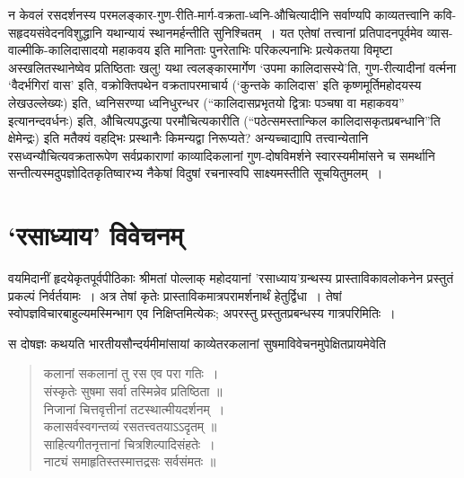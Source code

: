 {\dev न केवलं रसदर्शनस्य परमलङ्कार-गुण-रीति-मार्ग-वक्रता-ध्वनि-औचित्यादीनि सर्वाण्यपि काव्यतत्त्वानि कवि-सहृदयसंवेदनविशुद्धानि यथान्यायं स्थानमर्हन्तीति सुनिश्चितम्~। यत एतेषां तत्त्वानां प्रतिपादनपूर्वमेव व्यास-वाल्मीकि-कालिदासादयो महाकवय इति मानिताः पुनरेताभिः परिकल्पनाभिः प्रत्येकतया विमृष्टा अस्खलितस्थानेष्वेव प्रतिष्ठिताः खलु! यथा त्वलङ्कारमार्गेण `उपमा कालिदासस्ये'ति, गुण-रीत्यादीनां वर्त्मना `वैदर्भगिरां वास' इति, वक्रोक्तिपथेन वक्रतापरमाचार्य (`कुन्तके कालिदास' इति कृष्णमूर्तिमहोदयस्य लेख\break उल्लेख्यः) इति, ध्वनिसरण्या ध्वनिधुरन्धर (``कालिदासप्रभृतयो द्वित्राः पञ्चषा वा महाकवय'' इत्यानन्द\-वर्धनः) इति, औचित्यपद्धत्या परमौचित्यकारीति (``पठेत्समस्तान्किल कालिदास\-कृत\-प्रब\-न्धानि''ति  क्षेमेन्द्रः) इति मतैक्यं वहद्भिः प्रस्थानैः किमन्यद्वा निरूप्यते? अन्यच्चाद्यापि तत्त्वान्येतानि रसध्वन्यौचित्यवक्रतारूपेण सर्वप्रकाराणां काव्यादिकलानां गुण-दोषविमर्शने स्वारस्यमीमांसने च समर्थानि सन्तीत्यस्मदुपज्ञोदितकृतिष्वारभ्य नैकेषां विदुषां रचनास्वपि साक्ष्यमस्तीति सूचयितुमलम्~।} 

\section*{{\dev `रसाध्याय' विवेचनम्}}

{\dev वयमिदानीं हृदयेकृतपूर्वपीठिकाः श्रीमतां पोल्लाक् महोदयानां ’रसाध्याय’ग्रन्थस्य प्रास्तावि\-काव\-लोकनेन प्रस्तुतं प्रकल्पं निर्वर्तयामः~। अत्र तेषां कृतेः प्रास्ताविकमात्रपरामर्शनार्थं हेतु\-र्द्विधा~। तेषां स्वोपज्ञविचारबाहुल्यमस्मिन्भाग एव निक्षिप्तमित्येकः; अपरस्तु प्रस्तुतप्रबन्धस्य गात्र\-परिमितिः~।}

{\dev स दोषज्ञः कथयति भारतीयसौन्दर्यमीमांसायां काव्येतरकलानां सुषमाविवेचनमुपेक्षितप्राय\-मेवेति}  
\begin{quote}
{\dev कलानां सकलानां तु रस एव परा गतिः~।}\\
{\dev संस्कृतेः सुषमा सर्वा तस्मिन्नेव प्रतिष्ठिता ॥}\\[5pt]
{\dev निजानां चित्तवृत्तीनां तटस्थात्मीयदर्शनम्~।}\\
{\dev कलासर्वस्वगन्तव्यं रसतत्त्वतयाऽऽदृतम् ॥}\\[5pt]
{\dev साहित्यगीतनृत्तानां चित्रशिल्पादिसंहतेः~।}\\
{\dev नाट्यं समाहृतिस्तस्मात्तद्रसः सर्वसंमतः ॥}
\end{quote}

